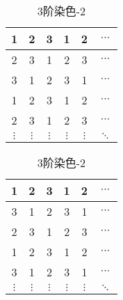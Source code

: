 \begin{table}[htbp]
	\caption{3阶染色}
	\label{fig:3-order-staining}
	\begin{subtable}{.5\linewidth}
		\centering
		\caption{3阶染色-1}
		\begin{tabular}{|c|c|c|c|c|c|}
			\hline
			1        & 2        & 3        & 1        & 2        & $\cdots$ \\
			\hline
			2        & 3        & 1        & 2        & 3        & $\cdots$ \\
			\hline
			3        & 1        & 2        & 3        & 1        & $\cdots$ \\
			\hline
			1        & 2        & 3        & 1        & 2        & $\cdots$ \\
			\hline
			2        & 3        & 1        & 2        & 3        & $\cdots$ \\
			\hline
			$\vdots$ & $\vdots$ & $\vdots$ & $\vdots$ & $\vdots$ & $\ddots$ \\
			\hline
		\end{tabular}
		\label{fig:3-order-staining-1}
	\end{subtable}%
	\begin{subtable}{.5\linewidth}
		\centering
		\caption{3阶染色-2}
		\begin{tabular}{|c|c|c|c|c|c|}
			\hline
			1        & 2        & 3        & 1        & 2        & $\cdots$ \\
			\hline
			3        & 1        & 2        & 3        & 1        & $\cdots$ \\
			\hline
			2        & 3        & 1        & 2        & 3        & $\cdots$ \\
			\hline
			1        & 2        & 3        & 1        & 2        & $\cdots$ \\
			\hline
			3        & 1        & 2        & 3        & 1        & $\cdots$ \\
			\hline
			$\vdots$ & $\vdots$ & $\vdots$ & $\vdots$ & $\vdots$ & $\ddots$ \\
			\hline
		\end{tabular}
		\label{fig:3-order-staining-2}
	\end{subtable}
\end{table}

